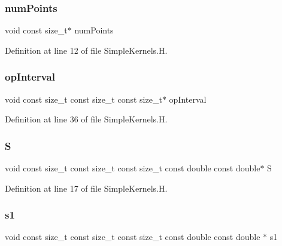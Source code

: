 \subsubsection{\texorpdfstring{num\+Points}{numPoints}}
{\footnotesize\ttfamily void const size\+\_\+t$\ast$ num\+Points}



Definition at line 12 of file Simple\+Kernels.\+H.

\hypertarget{SimpleKernels_8H_ad3376da8cc0376fa774bdc40b28a61ca}{}\label{SimpleKernels_8H_ad3376da8cc0376fa774bdc40b28a61ca} 
\subsubsection{\texorpdfstring{op\+Interval}{opInterval}}
{\footnotesize\ttfamily void const size\+\_\+t const size\+\_\+t const size\+\_\+t$\ast$ op\+Interval}



Definition at line 36 of file Simple\+Kernels.\+H.

\hypertarget{SimpleKernels_8H_a1851b05129a14a393984de733889e64b}{}\label{SimpleKernels_8H_a1851b05129a14a393984de733889e64b} 
\subsubsection{\texorpdfstring{S}{S}}
{\footnotesize\ttfamily void const size\+\_\+t const size\+\_\+t const size\+\_\+t const double const double$\ast$ S}



Definition at line 17 of file Simple\+Kernels.\+H.

\hypertarget{SimpleKernels_8H_aa6a88b876ab61540ae31ae77644dea1d}{}\label{SimpleKernels_8H_aa6a88b876ab61540ae31ae77644dea1d} 
\subsubsection{\texorpdfstring{s1}{s1}}
{\footnotesize\ttfamily void const size\+\_\+t const size\+\_\+t const size\+\_\+t const double const double $\ast$ s1}



